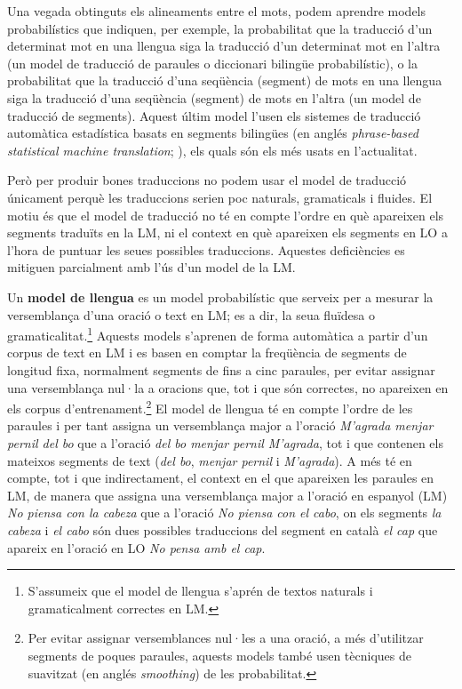 Una vegada obtinguts els alineaments entre el mots, podem aprendre
models probabilístics que indiquen, per exemple, la probabilitat que
la traducció d'un determinat mot en una llengua siga la traducció d'un
determinat mot en l'altra (un model de traducció de paraules o
diccionari bilingüe probabilístic), o la probabilitat que la traducció
d'una seqüència (segment) de mots en una llengua siga la traducció
d'una seqüència (segment) de mots en l'altra (un model de traducció de
segments). Aquest últim model l'usen els sistemes de traducció
automàtica estadística basats en segments bilingües (en anglés
\emph{phrase-based statistical machine translation}; \cite{koehnbook}),
els quals són els més usats en l'actualitat.

Però per produir bones traduccions no podem usar el model de traducció
únicament perquè les traduccions serien poc naturals, gramaticals i
fluides. El motiu és que el model de traducció no té en compte l'ordre
en què apareixen els segments traduïts en la LM, ni el context en què
apareixen els segments en LO a l'hora de puntuar les seues possibles
traduccions. Aquestes deficiències es mitiguen parcialment amb l'ús
d'un model de la LM.

Un \textbf{model de llengua} es un model probabilístic que serveix per
a mesurar la versemblança d'una oració o text en LM; es a dir, la seua
fluïdesa o gramaticalitat.\footnote{S'assumeix que el model de llengua
  s'aprén de textos naturals i gramaticalment correctes en LM.}
Aquests models s'aprenen de forma automàtica a partir d'un corpus de
text en LM i es basen en comptar la freqüència de segments de longitud
fixa, normalment segments de fins a cinc paraules, per evitar assignar
una versemblança nul·la a oracions que, tot i que són correctes, no
apareixen en els corpus d'entrenament.\footnote{Per evitar assignar
  versemblances nul·les a una oració, a més d'utilitzar segments de
  poques paraules, aquests models també usen tècniques de suavitzat
  (en anglés \emph{smoothing}) de les probabilitat.} El model de
llengua té en compte l'ordre de les paraules i per tant assigna un
versemblança major a l'oració \emph{M'agrada menjar pernil del bo} que
a l'oració \emph{del bo menjar pernil M'agrada}, tot i que contenen
els mateixos segments de text (\emph{del bo}, \emph{menjar pernil} i
\emph{M'agrada}). A més té en compte, tot i que indirectament, el
context en el que apareixen les paraules en LM, de manera que assigna
una versemblança major a l'oració en espanyol (LM) \emph{No piensa con
  la cabeza} que a l'oració \emph{No piensa con el cabo}, on els
segments \emph{la cabeza} i \emph{el cabo} són dues possibles
traduccions del segment en català \emph{el cap} que apareix en
l'oració en LO \emph{No pensa amb el cap}.

